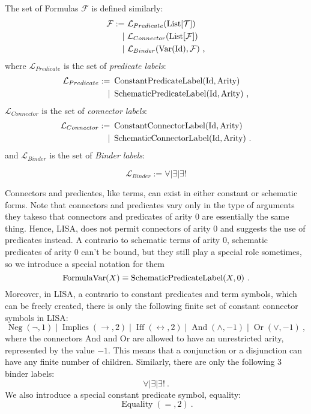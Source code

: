 \begin{defin}[Formulas]
  The set of Formulas $\mathcal{F}$ is defined similarly:
  \begin{align}
    \mathcal{F} := & ~\mathcal{L}_{Predicate}(\operatorname{List}[\mathcal{T}])                                  \\
    \mid           & ~\mathcal{L}_{Connector}(\operatorname{List}[\mathcal{F}])                                  \\
    \mid           & ~\mathcal{L}_{Binder}(\operatorname{Var}(\textnormal{Id}), \mathcal{F})~,
  \end{align}
  where $\mathcal{L}_{Predicate}$ is the set of \textit{predicate labels}:
  \begin{align}
    \mathcal{L}_{Predicate} := & ~\operatorname{ConstantPredicateLabel}(\textnormal{Id}, \textnormal{Arity})    \\
    \mid                       & ~\operatorname{SchematicPredicateLabel}(\textnormal{Id}, \textnormal{Arity})~,
  \end{align}
  $\mathcal{L}_{Connector}$ is the set of \textit{connector labels}:
  \begin{align}
    \mathcal{L}_{Connector} := & ~\operatorname{ConstantConnectorLabel}(\textnormal{Id}, \textnormal{Arity})    \\
    \mid                       & ~\operatorname{SchematicConnectorLabel}(\textnormal{Id}, \textnormal{Arity})~.
  \end{align}
  and $\mathcal{L}_{Binder}$ is the set of \textit{Binder labels}:
  
    $$\mathcal{L}_{Binder} := \forall \mid \exists \mid \exists!$$
  

  Connectors and predicates, like terms, can exist in either constant or schematic forms. Note that connectors and predicates vary only in the type of arguments they takeso that connectors and predicates of arity 0 are essentially the same thing. Hence, LISA, does not permit connectors of arity 0 and suggests the use of predicates instead.
  A contrario to schematic terms of arity 0, schematic predicates of arity 0 can't be bound, but they still play a special role sometimes, so we introduce a special notation for them
  $$
  \operatorname{FormulaVar}(X) \equiv \operatorname{SchematicPredicateLabel}(X, 0)~.
  $$
  Moreover, in LISA, a contrario to constant predicates and term symbols, which can be freely created, there is only the following finite set of constant connector symbols in LISA:
  $$
    \operatorname{Neg}(\neg, 1)\mid \operatorname{Implies}(\rightarrow, 2)\mid \operatorname{Iff}(\leftrightarrow, 2)\mid \operatorname{And}(\land, -1)\mid \operatorname{Or}(\lor, -1)~,
  $$
  where the connectors And and Or are allowed to have an unrestricted arity, represented by the value $-1$. This means that a conjunction or a disjunction can have any finite number of children.
  Similarly, there are only the following 3 binder labels:
  $$
    \forall \mid \exists \mid \exists !~.
  $$
  We also introduce a special constant predicate symbol, equality:
  $$
    \operatorname{Equality}(=, 2)~.
  $$
\end{defin}
